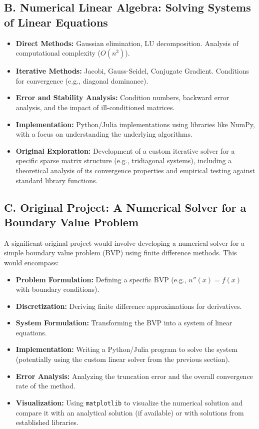 \documentclass[11pt, a4paper]{article}
\theoremstyle{plain} %
\theoremstyle{definition} %
\theoremstyle{remark} %
\begin{document}
\subsection{B. Numerical Linear Algebra: Solving Systems of Linear Equations}
\begin{itemize}
    \item \textbf{Direct Methods:} Gaussian elimination, LU decomposition. Analysis of computational complexity (\(O(n^3)\)).
    \item \textbf{Iterative Methods:} Jacobi, Gauss-Seidel, Conjugate Gradient. Conditions for convergence (e.g., diagonal dominance).
    \item \textbf{Error and Stability Analysis:} Condition numbers, backward error analysis, and the impact of ill-conditioned matrices.
    \item \textbf{Implementation:} Python/Julia implementations using libraries like NumPy, with a focus on understanding the underlying algorithms.
\item \textbf{Original Exploration:} Development of a custom iterative solver for a specific sparse matrix structure (e.g., tridiagonal systems), including a theoretical analysis of its convergence properties and empirical testing against standard library functions.
\end{itemize}

\subsection{C. Original Project: A Numerical Solver for a Boundary Value Problem}
A significant original project would involve developing a numerical solver for a simple boundary value problem (BVP) using finite difference methods. This would encompass:
\begin{itemize}
    \item \textbf{Problem Formulation:} Defining a specific BVP (e.g., \( u''(x) = f(x) \) with boundary conditions).
    \item \textbf{Discretization:} Deriving finite difference approximations for derivatives.
    \item \textbf{System Formulation:} Transforming the BVP into a system of linear equations.
    \item \textbf{Implementation:} Writing a Python/Julia program to solve the system (potentially using the custom linear solver from the previous section).
    \item \textbf{Error Analysis:} Analyzing the truncation error and the overall convergence rate of the method.
    \item \textbf{Visualization:} Using \texttt{matplotlib} to visualize the numerical solution and compare it with an analytical solution (if available) or with solutions from established libraries.
\end{itemize}
\end{document}
